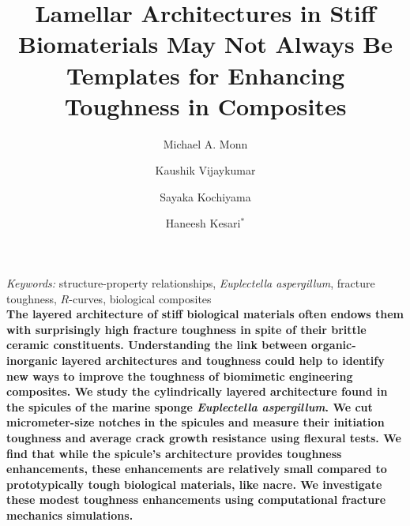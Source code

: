 \documentclass[12pt,onecolumn]{article}
\title{Lamellar Architectures in Stiff Biomaterials May Not Always Be Templates for Enhancing Toughness in Composites}
\author[1]{Michael A. Monn}
\author[1]{Kaushik Vijaykumar}
\author[1]{Sayaka Kochiyama}
\author[1]{Haneesh Kesari$^*$}
\affil[1]{Brown University School of Engineering, 184 Hope St, Providence, RI 02912, USA}
\date{}
\begin{document}
\maketitle
\emph{Keywords:}
structure-property relationships, 
\textit{Euplectella aspergillum}, 
fracture toughness, 
$R$-curves, 
biological composites
\\

{
\singlespacing\small \bf
The layered architecture of stiff biological materials often endows them with surprisingly high fracture toughness in spite of their brittle ceramic constituents. Understanding the link between organic-inorganic layered architectures and toughness could help to identify new ways to improve the toughness of biomimetic engineering composites. We study the cylindrically layered architecture found in the spicules of the marine sponge \textit{Euplectella aspergillum}. We cut micrometer-size notches in the spicules and measure their initiation toughness and average crack growth resistance using flexural tests. We find that while the spicule's architecture provides toughness enhancements, these enhancements are relatively small compared to prototypically tough biological materials, like nacre. We investigate these modest toughness enhancements using computational fracture mechanics simulations.
}


\doublespacing
\end{document}
